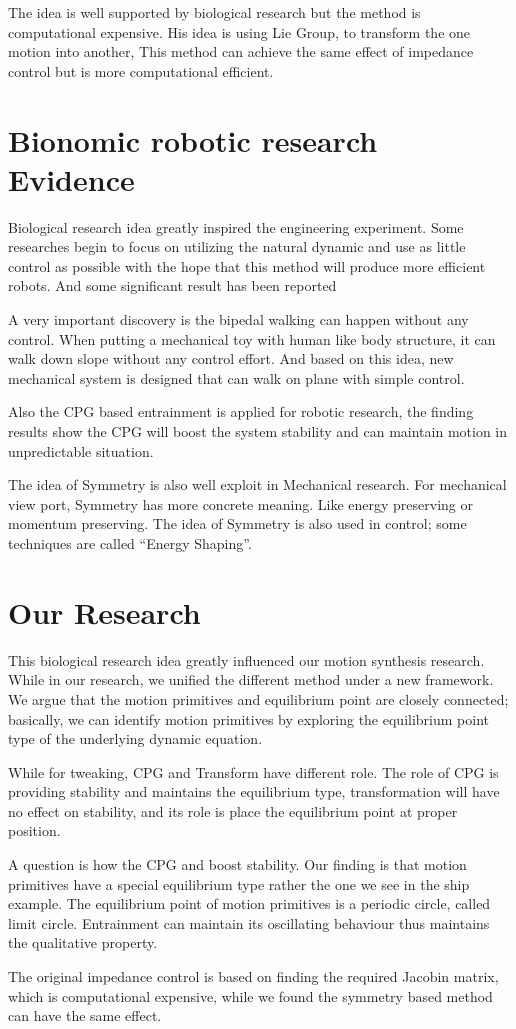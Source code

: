 The idea is well supported by biological research but the method is computational expensive.
His idea is using Lie Group, to transform the one motion into another,
This method can achieve the same effect of impedance control but is more computational efficient.


\section{Bionomic robotic research Evidence}
Biological research idea greatly inspired the engineering experiment.
Some researches begin to focus on utilizing the natural dynamic and use as little control as possible with the hope that this method will produce more efficient robots. And some significant result has been reported
\begin{itemize}
A very important discovery is the bipedal walking can happen without any control. When putting a mechanical toy with human like body structure, it can walk down slope without any control effort. And based on this idea, new mechanical system is designed that can walk on plane with simple control.

Also the CPG based entrainment is applied for robotic research, the finding results show the CPG will boost the system stability and can maintain motion in unpredictable situation.

The idea of Symmetry is also well exploit in Mechanical research.
For mechanical view port, Symmetry has more concrete meaning.
Like energy preserving or momentum preserving.
The idea of Symmetry is also used in control; some techniques are called “Energy Shaping”.
\end{itemize}

\section{Our Research}
This biological research idea greatly influenced our motion synthesis research.
While in our research, we unified the different method under a new framework.
We argue that the motion primitives and equilibrium point are closely connected; basically, we can identify motion primitives by exploring the equilibrium point type of the underlying dynamic equation. 

While for tweaking, CPG and Transform have different role. The role of CPG is providing stability and maintains the equilibrium type, transformation will have no effect on stability, and its role is place the equilibrium point at proper position.

A question is how the CPG and boost stability. Our finding is that motion primitives have a special equilibrium type rather the one we see in the ship example.
The equilibrium point of motion primitives is a periodic circle, called limit circle. Entrainment can maintain its oscillating behaviour thus maintains the qualitative property.

The original impedance control is based on finding the required Jacobin matrix, which is computational expensive, while we found the symmetry based method can have the same effect.
